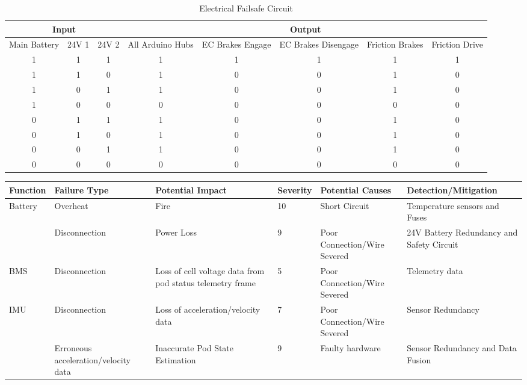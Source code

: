 \documentclass[hidelinks, twoside]{report}
\begin{document}
\begin{appendices}
\begin{table}[]
\centering
\caption{Electrical Failsafe Circuit}
\label{my-label}
\begin{tabular}{ccc|ccccc}
\hline
\multicolumn{3}{c}{Input}     & \multicolumn{5}{c}{Output} \\ \hline
Main Battery & 24V 1 & 24V 2   & All Arduino Hubs & EC Brakes Engage & EC Brakes Disengage & Friction Brakes & Friction Drive \\ \hline
1            & 1     & 1       & 1                & 1 & 1         & 1               & 1              \\
1            & 1     & 0       & 1                & 0 & 0        & 1               & 0              \\
1            & 0     & 1       & 1                & 0 & 0        & 1               & 0              \\
1            & 0     & 0       & 0                & 0 & 0        & 0               & 0              \\
0            & 1     & 1       & 1                & 0 & 0        & 1               & 0              \\
0            & 1     & 0       & 1                & 0 & 0        & 1               & 0              \\
0            & 0     & 1       & 1                & 0 & 0        & 1               & 0              \\
0            & 0     & 0       & 0                & 0 & 0        & 0               & 0              \\ \hline
\end{tabular}
\end{table}

\begin{table}
\centering
  \begin{tabular}{@{}p{2cm}p{2cm}p{3cm}p{1cm}p{3cm}p{3cm}@{}} \toprule
    Function & Failure Type & Potential Impact & Severity & Potential Causes & Detection/Mitigation \\ \midrule
    \multirow{2}{*}{Battery} & Overheat & Fire & 10 & Short Circuit & Temperature sensors and Fuses \\
    & Disconnection & Power Loss & 9 & Poor Connection/Wire Severed & 24V Battery Redundancy and Safety Circuit \\
    BMS & Disconnection & Loss of cell voltage data from pod status telemetry frame & 5 & Poor Connection/Wire Severed & Telemetry data \\
    \multirow{2}{*}{IMU} & Disconnection & Loss of acceleration/velocity data & 7 & Poor Connection/Wire Severed & Sensor Redundancy \\
    & Erroneous acceleration/velocity data & Inaccurate Pod State Estimation & 9 & Faulty hardware & Sensor Redundancy and Data Fusion \\



\end{tabular}
\end{table}
\end{appendices}
\end{document}
